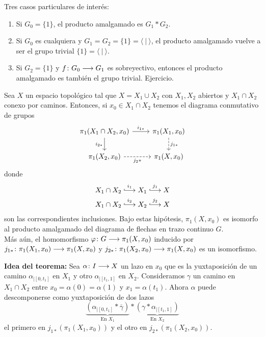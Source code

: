 \documentclass[GTS.tex]{subfiles}
\begin{document}
\begin{ej} Tres casos particulares de interés:
\begin{enumerate}
\item Si $G_0=\{1\}$, el producto amalgamado es $G_1*G_2$.
\item Si $G_0$ es cualquiera y $G_1=G_2=\{1\}=\langle\ |\ \rangle$, el producto amalgamado vuelve a ser el grupo trivial $\{1\}=\langle\ |\ \rangle$.
\item Si $G_2=\{1\}$ y $f\colon{G_0}\longrightarrow{G_1}$ es sobreyectivo, entonces el producto amalgamado es también el grupo trivial. Ejercicio.
\end{enumerate}

\end{ej}


\begin{teorema}\label{SVK} Sea $X$ un espacio topológico tal que $X=X_1\cup X_2$ con $X_1, X_2$ abiertos y $X_1\cap X_2$ conexo por caminos. Entonces, si $x_0\in X_1\cap X_2$ tenemos el diagrama conmutativo de grupos
\[
\begin{tikzcd}
\pi_1(X_1\cap X_2,x_0) \ar[r, "i_{1*}"]\arrow[d,"i_{2*} "'] & \pi_1(X_1,x_0)\ar[d,dashed,"j_{1*}"]\\
\pi_1(X_2,x_0)\ar[r,dashed,"{j_2}*"'] & \pi_1(X,x_0)
\end{tikzcd}
\]
donde
\begin{gather*}
X_1\cap X_2\overset{i_1}{\longhookarrow} X_1\overset{j_1}{\longhookarrow} X\\
X_1\cap X_2\overset{i_2}{\longhookarrow} X_2\overset{j_2}{\longhookarrow} X
\end{gather*}
son las correspondientes inclusiones. Bajo estas hipótesis, $\pi_1(X,x_0)$ es isomorfo al producto amalgamado del diagrama de flechas en trazo continuo  $G$.\\
Más aún, el homomorfismo $\varphi\colon{G}\longrightarrow{\pi_1(X,x_0)}$ inducido por $j_{1*}\colon{\pi_1(X_1,x_0)}\longrightarrow{\pi_1(X,x_0)}$ y $j_{2*}\colon{\pi_1(X_2,x_0)}\longrightarrow{\pi_1(X,x_0)}$ es un isomorfismo.
\end{teorema}

{\bf Idea del teorema:}
Sea $\alpha\colon{I}\longrightarrow{X}$ un lazo en $x_0$ que es la yuxtaposición de un camino $\alpha_{\big|[0,t_1]}$ en $X_1$ y otro $\alpha_{\big|[t_1,1]}$ en $X_2$. Consideramos $\gamma$ un camino en $X_1\cap X_2$ entre $x_0=\alpha(0)=\alpha(1)$ y $x_1=\alpha(t_1)$. Ahora $\alpha$ puede descomponerse como yuxtaposición de dos lazos
\[
\underbrace{(\alpha_{\big|[0,t_1]}*\overline{\gamma})}_{\text{En }X_1}*\underbrace{(\gamma*\alpha_{\big|[t_1,1]})}_{\text{En }X_2}
\]
el primero en $j_{1*}(\pi_1(X_1,x_0))$ y el otro en $j_{2*}(\pi_1(X_2,x_0))$.
\end{document}
